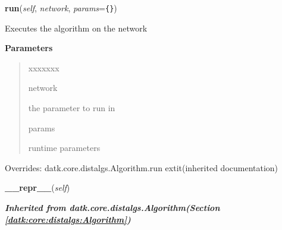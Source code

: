     \vspace{0.5ex}

\hspace{.8\funcindent}\begin{boxedminipage}{\funcwidth}

    \raggedright \textbf{run}(\textit{self}, \textit{network}, \textit{params}={\tt \texttt{\{}\texttt{\}}})

\setlength{\parskip}{2ex}
    Executes the algorithm on the network

\setlength{\parskip}{1ex}
      \textbf{Parameters}
      \vspace{-1ex}

      \begin{quote}
        \begin{Ventry}{xxxxxxx}

          \item[network]

          the parameter to run in

          \item[params]

          runtime parameters

        \end{Ventry}

      \end{quote}

      Overrides: datk.core.distalgs.Algorithm.run 	extit{(inherited documentation)}

    \end{boxedminipage}

    \label{datk:core:distalgs:Chain:__repr__}

    \vspace{0.5ex}

\hspace{.8\funcindent}\begin{boxedminipage}{\funcwidth}

    \raggedright \textbf{\_\_repr\_\_}(\textit{self})

\setlength{\parskip}{2ex}
\setlength{\parskip}{1ex}
    \end{boxedminipage}


\large{\textbf{\textit{Inherited from datk.core.distalgs.Algorithm\textit{(Section \ref{datk:core:distalgs:Algorithm})}}}}

